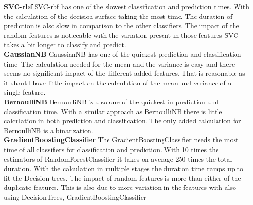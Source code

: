 \documentclass[a4paper,10pt]{article}
\begin{document}
\textbf{SVC-rbf} SVC-rbf has one of the slowest classification and prediction times. With the calculation of the decision surface taking the most time. The duration of prediction is also slow in comparison to the other classifiers. The impact of the random features is noticeable with the variation present in those features SVC takes a bit longer to  classify and predict. \\

\textbf{GaussianNB} GaussianNB has one of the quickest prediction and classification time. The calculation needed for the mean and the variance is easy and there seems no significant impact of the different added features. That is reasonable as it should have little impact on the calculation of the mean and variance of a single feature.\\

\textbf{BernoulliNB} BernoulliNB is also one of the quickest in prediction and classification time. With a similar approach as BernoulliNB there is little calculation in both prediction and classification. The only added calculation for BernoulliNB is a binarization. \\

\textbf{GradientBoostingClassifier} The GradientBoostingClassifier needs the most time of all classifiers for classification and prediction. With 10 times the estimators of RandomForestClassifier it takes on average 250 times the total duration. With the calculation in multiple stages the duration time ramps up to fit the Decision trees. The impact of random features is more than either of the duplicate features. This is also due to more variation in the features with also using DecisionTrees, GradientBoostingClassifier %
  \\

\end{document}
